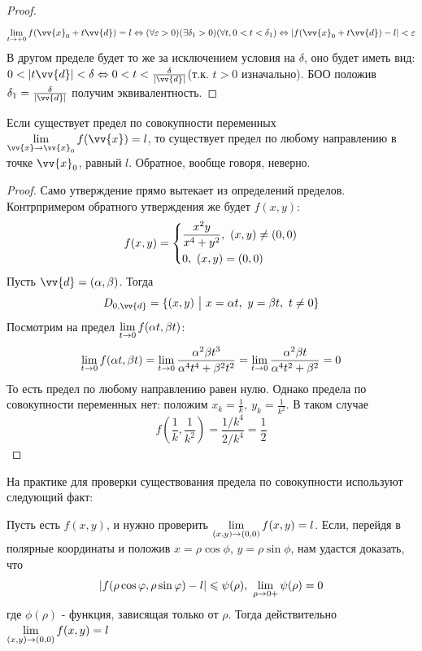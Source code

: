 \begin{proof}
	\[
		\liml_{t \to +0} f(\vv{x}_0 + t \vv{d}) = l \Leftrightarrow (\forall \varepsilon > 0)(\exists \delta_1 > 0)(\forall t, 0 < t < \delta_1) \Leftrightarrow |f(\vv{x}_0 + t \vv{d}) - l| < \varepsilon
	\]
	В другом пределе будет то же за исключением условия на $\delta$, оно будет иметь вид: $0 < |t\vv{d}| < \delta \Leftrightarrow 0 < t < \frac{\delta}{|\vv{d}|}$(т.к. $t > 0$ изначально). БОО положив $\delta_1 = \frac{\delta}{|\vv{d}|}$ получим эквивалентность.
\end{proof}

\begin{theorem}
	Если существует предел по совокупности переменных $\liml_{\vv{x} \to \vv{x}_0} f(\vv{x}) = l$, то существует предел по любому направлению в точке $\vv{x}_0$, равный $l$. Обратное, вообще говоря, неверно.
\end{theorem}

\begin{proof}
	Само утверждение прямо вытекает из определений  пределов. Контрпримером обратного утверждения же будет $f(x, y)$:
	\[
		f(x, y) = \left\{\begin{aligned}
			&{\frac{x^2 y}{x^4 + y^2},\ (x, y) \neq (0, 0)}
			\\
			&{0,\ (x, y) = (0, 0)}
		\end{aligned}\right.
	\]
	Пусть $\vv{d} = (\alpha, \beta)$. Тогда
	\[
		D_{0, \vv{d}} = \{(x, y) \such x = \alpha t,\ y = \beta t,\ t \neq 0\}
	\]
	Посмотрим на предел $\lim\limits_{t \to 0} f(\alpha t, \beta t)$:
	\[
		\lim\limits_{t \to 0} f(\alpha t, \beta t) = \lim\limits_{t \to 0} \frac{\alpha^2 \beta t^3}{\alpha^4 t^4 + \beta^2 t^2} = \lim\limits_{t \to 0} \frac{\alpha^2 \beta t}{\alpha^4 t^2 + \beta^2} = 0
	\]
	То есть предел по любому направлению равен нулю. Однако предела по совокупности переменных нет: положим $x_k = \frac{1}{k},\ y_k = \frac{1}{k^2}$. В таком случае
	\[
		f\left(\frac{1}{k}, \frac{1}{k^2}\right) = \frac{1 / k^4}{2 / k^4} = \frac{1}{2}
	\]
\end{proof}

\begin{addition}
	На практике для проверки существования предела по совокупности используют следующий факт:
	
	Пусть есть $f(x, y)$, и нужно проверить $\lim\limits_{(x, y) \to (0, 0)} f(x, y) = l$. Если, перейдя в полярные координаты и положив $x = \rho \cos \phi$, $y = \rho \sin \phi$, нам удастся доказать, что
	\[
		|f(\rho \cos\varphi, \rho \sin\varphi) - l| \leqslant \psi(\rho),\ \lim\limits_{\rho \to 0+} \psi(\rho) = 0
	\]
	где $\phi(\rho)$ - функция, зависящая только от $\rho$. Тогда действительно $\lim\limits_{(x, y) \to (0, 0)} f(x, y) = l$
\end{addition}

